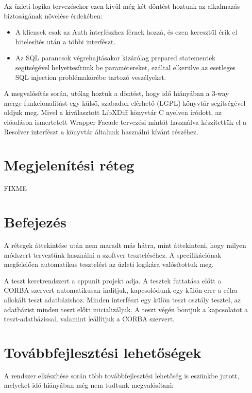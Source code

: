 \documentclass[a4paper,12pt]{article}
\begin{document}
Az üzleti logika tervezésekor ezen kívül még két döntést hoztunk az alkalmazás
biztoságának növelése érdekében:

\begin{itemize}
\item A kliensek csak az Auth interfészhez férnek hozzá, és ezen keresztül érik
el hitelesítés után a többi interfészt.
\item Az SQL parancsok végrehajtásakor kizárólag prepared statementek
segítségével helyettesítünk be paramétereket, ezáltal elkerülve az esetleges
SQL injection problémakörébe tartozó veszélyeket.
\end{itemize}

A megvalósítás során, utólag hoztuk a döntést, hogy idő hiányában a 3-way merge
funkcionalitást egy külső, szabadon elérhető (LGPL) könyvtár segítségével
oldjuk meg. Mivel a kiválasztott LibXDiff könyvtár C nyelven íródott, az
előadáson ismertetett Wrapper Facade tervezési mintát használva készítettük el
a Resolver interfészt a könyvtár általunk használni kívánt részéhez.

\section{Megjelenítési réteg}

FIXME

\section{Befejezés}

A rétegek áttekintése után nem maradt más hátra, mint áttekinteni, hogy milyen
módszert terveztünk használni a szoftver teszteléséhez. A specifikációnak
megfelelően automatikus tesztelést az üzleti logikára valósítottuk meg.

A teszt keretrendszert a cppunit projekt adja. A tesztek futtatása előtt a
CORBA szervert automatikusan indítjuk, kapcsolódunk egy külön erre a célra
allokált teszt adatbázishoz. Minden interfészt egy külön teszt osztály tesztel,
az adatbázist minden teszt előtt inicializáljuk. A teszt végén bontjuk a
kapcsolatot a teszt-adatbázissal, valamint leállítjuk a CORBA szervert.

\section{Továbbfejlesztési lehetőségek}

A rendszer elkészítése során több továbbfejlesztési lehetőség is eszünkbe
jutott, melyeket idő hiányában még nem tudtunk megvalósítani:
\end{document}
